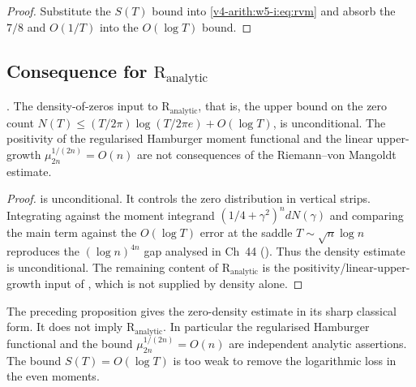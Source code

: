 \begin{proof}
Substitute the \(S(T)\) bound into \eqref{v4-arith:w5-i:eq:rvm} and
absorb the \(7/8\) and \(O(1/T)\) into the \(O(\log T)\) bound.
\end{proof}

\subsection{Consequence for \(\mathrm{R}_{\mathrm{analytic}}\)}
\label{v4-arith:w5-i:R-analytic-closure}

\begin{proposition}
\label{v4-arith:w5-i:prop:R-analytic-density}
\ClaimStatusProvedHere. The density-of-zeros input to
\(\mathrm{R}_{\mathrm{analytic}}\), that is, the upper bound on the
zero count \(N(T)\leq (T/2\pi)\log(T/2\pi e)+O(\log T)\), is
unconditional. The positivity of the regularised Hamburger moment
functional and the linear upper-growth
\(\mu_{2n}^{1/(2n)}=O(n)\) are not consequences of the
Riemann--von Mangoldt estimate.
\end{proposition}

\begin{proof}
 is unconditional. It controls the
zero distribution in vertical strips. Integrating against the moment
integrand \((1/4+\gamma^{2})^{n}dN(\gamma)\) and comparing the main
term against the \(O(\log T)\) error at the saddle
\(T\sim\sqrt{n}\log n\) reproduces the \((\log n)^{4n}\) gap analysed in
Ch~44 (). Thus
the density estimate is unconditional. The remaining content of
\(\mathrm{R}_{\mathrm{analytic}}\) is the
positivity/linear-upper-growth input of
, which is not
supplied by density alone.
\end{proof}

\begin{remark}
\label{v4-arith:w5-i:rem:density-closure-domain}
The preceding proposition gives the zero-density estimate in its sharp
classical form. It does not imply
\(\mathrm{R}_{\mathrm{analytic}}\). In particular the regularised
Hamburger functional and the bound
\(\mu_{2n}^{1/(2n)}=O(n)\) are independent analytic assertions. The
bound \(S(T)=O(\log T)\) is too weak to remove the logarithmic loss in
the even moments.
\end{remark}

